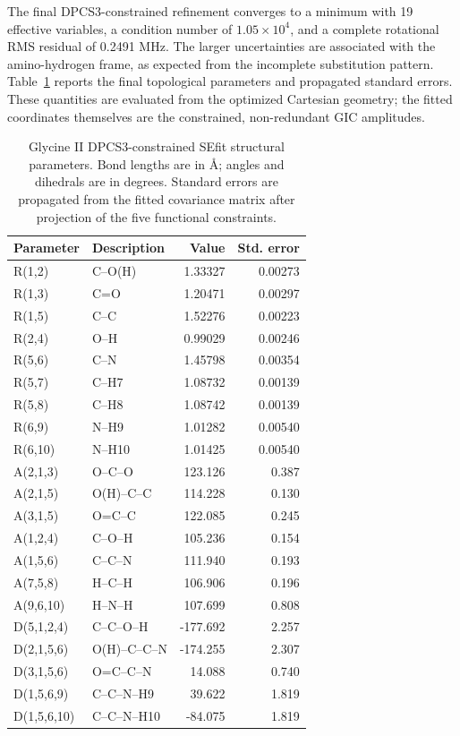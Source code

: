 \documentclass[journal=jctcce,manuscript=article,maxauthors=999]{achemso}
\begin{document}
The final DPCS3-constrained refinement converges to a minimum with 19
effective variables, a condition number of $1.05\times10^4$, and a complete
rotational RMS residual of 0.2491 MHz. The larger uncertainties are associated
with the amino-hydrogen frame, as expected from the incomplete substitution
pattern. Table~\ref{tab:glycine-geometry} reports the final topological
parameters and propagated standard errors. These quantities are evaluated
from the optimized Cartesian geometry; the fitted coordinates themselves are
the constrained, non-redundant GIC amplitudes.

\begin{table}
\caption{Glycine II DPCS3-constrained SEfit structural parameters. Bond lengths are in \AA; angles and dihedrals are in degrees. Standard errors are propagated from the fitted covariance matrix after projection of the five functional constraints.}
\label{tab:glycine-geometry}
\scriptsize
\begin{tabular}{llrr}
\toprule
Parameter & Description & Value & Std. error \\
\midrule
R(1,2) & C--O(H) & 1.33327 & 0.00273 \\
R(1,3) & C=O & 1.20471 & 0.00297 \\
R(1,5) & C--C & 1.52276 & 0.00223 \\
R(2,4) & O--H & 0.99029 & 0.00246 \\
R(5,6) & C--N & 1.45798 & 0.00354 \\
R(5,7) & C--H7 & 1.08732 & 0.00139 \\
R(5,8) & C--H8 & 1.08742 & 0.00139 \\
R(6,9) & N--H9 & 1.01282 & 0.00540 \\
R(6,10) & N--H10 & 1.01425 & 0.00540 \\
A(2,1,3) & O--C--O & 123.126 & 0.387 \\
A(2,1,5) & O(H)--C--C & 114.228 & 0.130 \\
A(3,1,5) & O=C--C & 122.085 & 0.245 \\
A(1,2,4) & C--O--H & 105.236 & 0.154 \\
A(1,5,6) & C--C--N & 111.940 & 0.193 \\
A(7,5,8) & H--C--H & 106.906 & 0.196 \\
A(9,6,10) & H--N--H & 107.699 & 0.808 \\
D(5,1,2,4) & C--C--O--H & -177.692 & 2.257 \\
D(2,1,5,6) & O(H)--C--C--N & -174.255 & 2.307 \\
D(3,1,5,6) & O=C--C--N & 14.088 & 0.740 \\
D(1,5,6,9) & C--C--N--H9 & 39.622 & 1.819 \\
D(1,5,6,10) & C--C--N--H10 & -84.075 & 1.819 \\
\bottomrule
\end{tabular}
\end{table}
\end{document}
